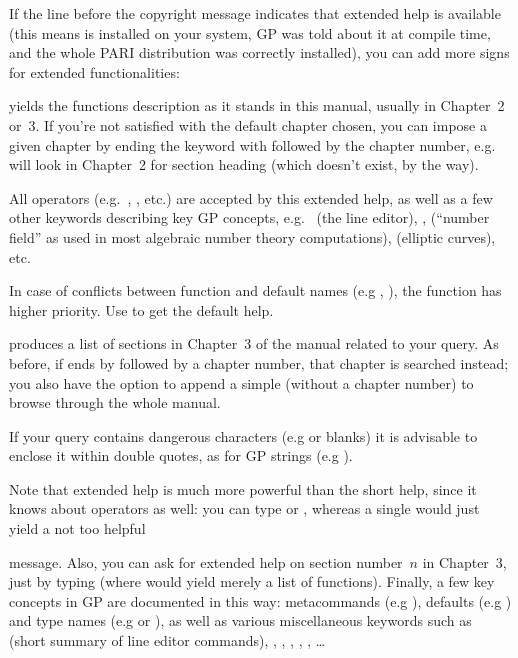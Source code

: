 \unix If the line before the copyright message indicates that extended help
is available (this means  is installed on your system, GP was
told about it at compile time, and the whole PARI distribution was
correctly installed), you can add more  signs for extended
functionalities:

 yields the functions description as it stands in this
manual, usually in Chapter~2 or~3. If you're not satisfied with the default
chapter chosen, you can impose a given chapter by ending the keyword with
 followed by the chapter number, e.g.~ will look in
Chapter~2 for section heading  (which doesn't exist, by the way).

All operators (e.g.~\kbd{+}, \kbd{\&\&}, etc.) are accepted by this
extended help, as well as a few other keywords describing key GP concepts,
e.g.~ (the line editor), ,  (``number
field'' as used in most algebraic number theory computations), 
(elliptic curves), etc.

In case of conflicts between function and default names (e.g ,
), the function has higher priority. Use  to get the default help.

 produces a list of sections in Chapter~3 of the
manual related to your query. As before, if  ends by 
followed by a chapter number, that chapter is searched instead; you also
have the option to append a simple  (without a chapter number) to
browse through the whole manual.

If your query contains dangerous characters (e.g  or blanks) it is
advisable to enclose it within double quotes, as for GP strings (e.g
).

Note that extended help is much more powerful than the short help, since
it knows about operators as well: you can type  or
, whereas a single  would just yield a not too helpful


\noindent message. Also, you can ask for extended help on section
number~$n$ in Chapter~3, just by typing  (where  would
yield merely a list of functions). Finally, a few key concepts in GP are
documented in this way: metacommands (e.g ), defaults (e.g
) and type names (e.g  or ), as well as
various miscellaneous keywords such as  (short summary of line
editor commands), , , ,
, , \dots

